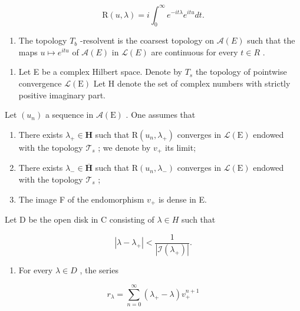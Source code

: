 \[
\mathrm{R} (u, \lambda) = i \int_ {0} ^ {\infty} e ^ {- i t \lambda} e ^ {i t u} d t.
\]

\begin{enumerate}
\def\labelenumi{\alph{enumi})}
\setcounter{enumi}{1}
\tightlist
\item
  The topology \(T_{b}\) -resolvent is the coarsest topology on \(\mathcal{A}(E)\) such that the maps \(u \mapsto e^{itu}\) of \(\mathcal{A}(E)\) in \(\mathcal{L}(E)\) are continuous for every \(t \in R\) .
\end{enumerate}

\begin{enumerate}
\def\labelenumi{\arabic{enumi})}
\setcounter{enumi}{30}
\tightlist
\item
  Let E be a complex Hilbert space. Denote by \(T_{s}\) the topology of pointwise convergence \(\mathcal{L}(\mathrm{E})\) Let H denote the set of complex numbers with strictly positive imaginary part.
\end{enumerate}

Let \((u_{n})\) a sequence in \(\mathcal{A}(\mathrm{E})\) . One assumes that

\begin{enumerate}
\def\labelenumi{(\roman{enumi})}
\item
  There exists \(\lambda_{+} \in \mathbf{H}\) such that \(\mathrm{R}(u_n, \lambda_{+})\) converges in \(\mathcal{L}(\mathrm{E})\) endowed with the topology \(\mathcal{T}_s\) ; we denote by \(v_{+}\) its limit;
\item
  There exists \(\lambda_{-} \in \overline{\mathbf{H}}\) such that \(\mathrm{R}(u_n, \lambda_{-})\) converges in \(\mathcal{L}(\mathrm{E})\) endowed with the topology \(\mathcal{T}_s\) ;
\item
  The image F of the endomorphism \(v_{+}\) is dense in E.
\end{enumerate}

Let D be the open disk in C consisting of \(\lambda \in H\) such that

\[
| \lambda - \lambda_ {+} | <   \frac {1}{| \mathcal {I} (\lambda_ {+}) |}.
\]

\begin{enumerate}
\def\labelenumi{\alph{enumi})}
\tightlist
\item
  For every \(\lambda \in D\) , the series
\end{enumerate}

\[
r _ {\lambda} = \sum_ {n = 0} ^ {\infty} (\lambda_ {+} - \lambda) v _ {+} ^ {n + 1}
\]

